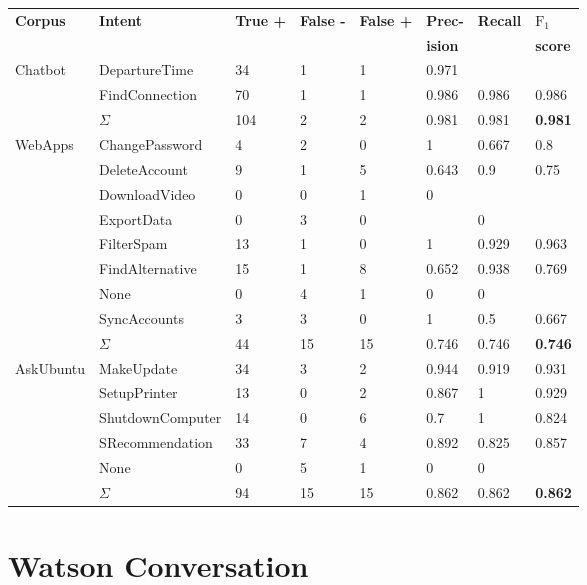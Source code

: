 \begin{center}
    \begin{tabular}{l l l l l l l l}
        \textbf{Corpus} & \textbf{Intent} & \textbf{True +} & \textbf{False -} & \textbf{False +} & \textbf{Prec-} & \textbf{Recall} & \textbf{$\text{F}_1$}\\
        & & & & & \textbf{ision} & & \textbf{score} \\
        \hline
        \multirow{3}{*}{Chatbot} & DepartureTime & 34 & 1 & 1 & 0.971 & &  \\
        & FindConnection & 70 & 1 & 1 & 0.986 & 0.986 & 0.986 \\
        & $\Sigma$ & 104 & 2 & 2 & 0.981 & 0.981 & \textbf{0.981} \\
        \hline
        \multirow{9}{*}{WebApps} & ChangePassword & 4 & 2 & 0 & 1 & 0.667 & 0.8 \\
        & DeleteAccount & 9 & 1 & 5 & 0.643 & 0.9 & 0.75 \\
        & DownloadVideo & 0 & 0 & 1 & 0 & &  \\
        & ExportData & 0 & 3 & 0 & & 0 &  \\
        & FilterSpam & 13 & 1 & 0 & 1 & 0.929 & 0.963 \\
        & FindAlternative & 15 & 1 & 8 & 0.652 & 0.938 & 0.769 \\
        & None & 0 & 4 & 1 & 0 & 0 &  \\
        & SyncAccounts & 3 & 3 & 0 & 1 & 0.5 & 0.667 \\
        & $\Sigma$ & 44 & 15 & 15 & 0.746 & 0.746 & \textbf{0.746} \\
        \hline
        \multirow{6}{*}{AskUbuntu} \hspace*{-3mm} & MakeUpdate & 34 & 3 & 2 & 0.944 & 0.919 & 0.931 \\
        & SetupPrinter & 13 & 0 & 2 & 0.867 & 1 & 0.929 \\
        & ShutdownComputer \hspace*{-3mm} & 14 & 0 & 6 & 0.7 & 1 & 0.824 \\
        & SRecommendation & 33 & 7 & 4 & 0.892 & 0.825 & 0.857\\
        & None & 0 & 5 & 1 & 0 & 0 \\
        & $\Sigma$ & 94 & 15 & 15 & 0.862 & 0.862 & \textbf{0.862}\\
        \hline
    \end{tabular}
\end{center}

\section{Watson Conversation}
\label{sec:recalculations_watson}
\vspace*{1cm}

